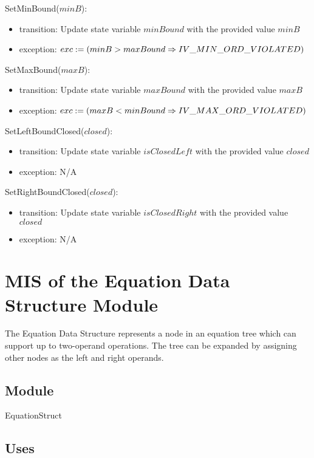 \documentclass[12pt, titlepage]{article}
\begin{document}
\noindent SetMinBound($minB$):
\begin{itemize}
	\item transition: Update state variable $minBound$ with the provided value 
	$minB$
	\item exception: $exc := \\
	(minB > maxBound \Rightarrow IV\_MIN\_ORD\_VIOLATED)$
\end{itemize}

\noindent SetMaxBound($maxB$):
\begin{itemize}
	\item transition: Update state variable $maxBound$ with the provided value 
	$maxB$
	\item exception: $exc := \\
	(maxB < minBound \Rightarrow IV\_MAX\_ORD\_VIOLATED)$
\end{itemize}

\noindent SetLeftBoundClosed($closed$):
\begin{itemize}
	\item transition: Update state variable $isClosedLeft$ with the provided 
	value $closed$
	\item exception: N/A
\end{itemize}

\noindent SetRightBoundClosed($closed$):
\begin{itemize}
	\item transition: Update state variable $isClosedRight$ with the provided 
	value $closed$
	\item exception: N/A
\end{itemize}

\newpage

\section{MIS of the Equation Data Structure Module} 
\label{Module_equationdatastructure}
The Equation Data Structure represents a node in an equation tree which can 
support up to two-operand operations. The tree can be expanded by assigning 
other nodes as the left and right operands.

\subsection{Module}

EquationStruct

\subsection{Uses}
\end{document}
